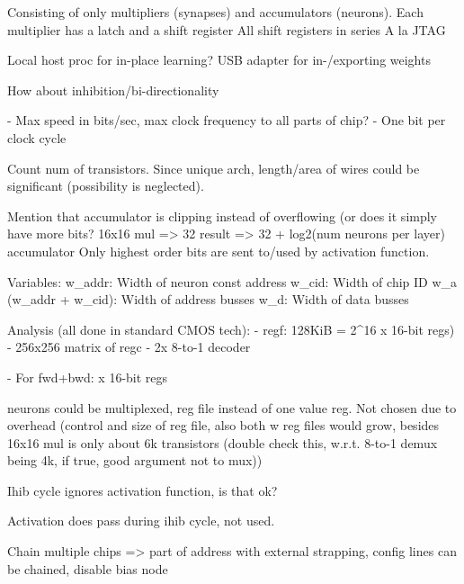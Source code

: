 \documentclass[twocolumn]{article}
\begin{document}
Consisting of only multipliers (synapses) and accumulators (neurons).
Each multiplier has a latch and a shift register
All shift registers in series
A la JTAG


Local host proc for in-place learning?
USB adapter for in-/exporting weights


How about inhibition/bi-directionality


- Max speed in bits/sec, max clock frequency to all parts of chip?
   - One bit per clock cycle



Count num of transistors.
Since unique arch, length/area of wires could be significant (possibility is neglected).

Mention that accumulator is clipping instead of overflowing (or does it simply have more bits?
16x16 mul => 32 result => 32 + log2(num neurons per layer) accumulator
Only highest order bits are sent to/used by activation function.




Variables:
w_addr: Width of neuron const address
w_cid: Width of chip ID
w_a (w_addr + w_cid): Width of address busses
w_d: Width of data busses








Analysis (all done in standard CMOS tech):
  - regf: 128KiB = 2^16 x 16-bit regs)
    - 256x256 matrix of regc
    - 2x 8-to-1 decoder

    - For fwd+bwd: x 16-bit regs








neurons could be multiplexed, reg file instead of one value reg. Not chosen due to overhead (control and size of reg file, also both w reg files would grow, besides 16x16 mul is only about 6k transistors (double check this, w.r.t. 8-to-1 demux being 4k, if true, good argument not to mux))


Ihib cycle ignores activation function, is that ok?

Activation does pass during ihib cycle, not used.


Chain multiple chips => part of address with external strapping, config lines can be chained, disable bias node
\end{document}
